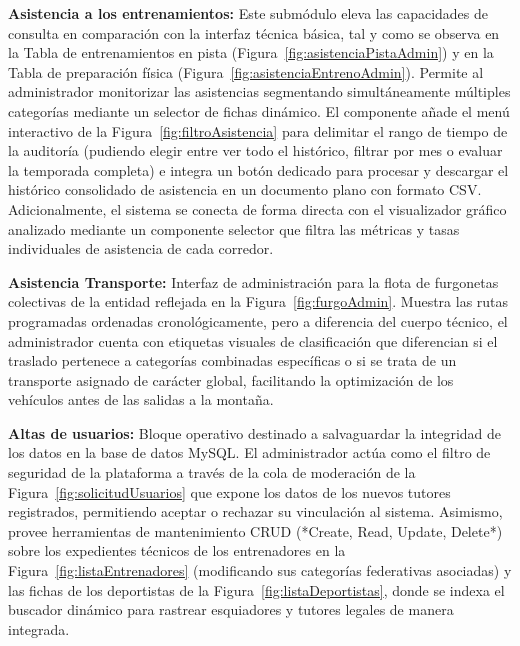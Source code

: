 \noindent \textbf{Asistencia a los entrenamientos:} Este submódulo eleva las capacidades de consulta en comparación con la interfaz técnica básica, tal y como se observa en la Tabla de entrenamientos en pista (Figura~\ref{fig:asistenciaPistaAdmin}) y en la Tabla de preparación física (Figura~\ref{fig:asistenciaEntrenoAdmin}). Permite al administrador monitorizar las asistencias segmentando simultáneamente múltiples categorías mediante un selector de fichas dinámico. El componente añade el menú interactivo de la Figura~\ref{fig:filtroAsistencia} para delimitar el rango de tiempo de la auditoría (pudiendo elegir entre ver todo el histórico, filtrar por mes o evaluar la temporada completa) e integra un botón dedicado para procesar y descargar el histórico consolidado de asistencia en un documento plano con formato CSV. Adicionalmente, el sistema se conecta de forma directa con el visualizador gráfico analizado mediante un componente selector que filtra las métricas y tasas individuales de asistencia de cada corredor. \par \smallskip

\noindent \textbf{Asistencia Transporte:} Interfaz de administración para la flota de furgonetas colectivas de la entidad reflejada en la Figura~\ref{fig:furgoAdmin}. Muestra las rutas programadas ordenadas cronológicamente, pero a diferencia del cuerpo técnico, el administrador cuenta con etiquetas visuales de clasificación que diferencian si el traslado pertenece a categorías combinadas específicas o si se trata de un transporte asignado de carácter global, facilitando la optimización de los vehículos antes de las salidas a la montaña. \par \smallskip

\noindent \textbf{Altas de usuarios:} Bloque operativo destinado a salvaguardar la integridad de los datos en la base de datos MySQL. El administrador actúa como el filtro de seguridad de la plataforma a través de la cola de moderación de la Figura~\ref{fig:solicitudUsuarios} que expone los datos de los nuevos tutores registrados, permitiendo aceptar o rechazar su vinculación al sistema. Asimismo, provee herramientas de mantenimiento CRUD (*Create, Read, Update, Delete*) sobre los expedientes técnicos de los entrenadores en la Figura~\ref{fig:listaEntrenadores} (modificando sus categorías federativas asociadas) y las fichas de los deportistas de la Figura~\ref{fig:listaDeportistas}, donde se indexa el buscador dinámico para rastrear esquiadores y tutores legales de manera integrada.

